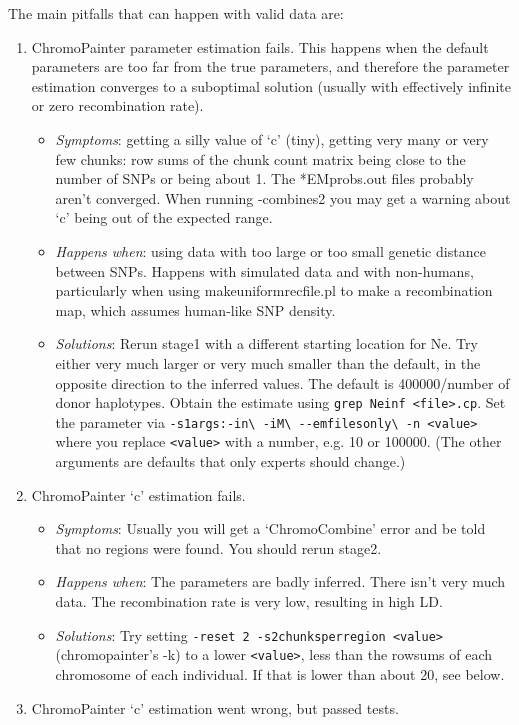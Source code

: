\documentclass[11pt]{article}
\begin{document}
The main pitfalls that can happen with valid data are:
\begin{enumerate}
\item ChromoPainter parameter estimation fails.  This happens when the default parameters are too far from the true parameters, and therefore the parameter estimation converges to a suboptimal solution (usually with effectively infinite or zero recombination rate). 
\begin{itemize}
\item \emph{Symptoms}: getting a silly value of `c' (tiny), getting very many or very few chunks: row sums of the chunk count matrix being close to the number of SNPs or being about 1. The *EMprobs.out files probably aren't converged. When running -combines2 you may get a warning about `c' being out of the expected range.
\item \emph{Happens when}: using data with too large or too small genetic distance between SNPs. Happens with simulated data and with non-humans, particularly when using makeuniformrecfile.pl to make a recombination map, which assumes human-like SNP density.
\item \emph{Solutions}: Rerun stage1 with a different starting location for Ne. Try either very much larger or very much smaller than the default, in the opposite direction to the inferred values. The default is 400000/number of donor haplotypes. Obtain the estimate using \verb!grep Neinf <file>.cp!. Set the parameter via \verb!-s1args:-in\ -iM\ --emfilesonly\ -n <value>! where you replace \verb!<value>! with a number, e.g. 10 or 100000. (The other arguments are defaults that only experts should change.)
\end{itemize}
\item ChromoPainter `c' estimation fails.
\begin{itemize}
\item \emph{Symptoms}: Usually  you will get a `ChromoCombine' error and be told that no regions were found. You should rerun stage2. 
\item \emph{Happens when}: The parameters are badly inferred. There isn't very much data. The recombination rate is very low, resulting in high LD.
\item \emph{Solutions}: Try setting \verb!-reset 2 -s2chunksperregion <value>! (chromopainter's -k) to a lower \verb!<value>!, less than the rowsums of each chromosome of each individual. If that is lower than about 20, see below.
\end{itemize}
\item ChromoPainter `c' estimation went wrong, but passed tests.

\end{enumerate}
\end{document}
